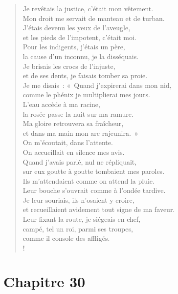 \documentclass[french,twoside]{book} %
\def\mednobreak{\ifdim\lastskip<\medskipamount
  \removelastskip\nopagebreak\medskip\fi}
\newcommand{\labelblock}[1]{\medbreak{\noindent\color{rubric}\bfseries #1}\par\mednobreak}
\newcommand\chapteropen{} %
\newcommand\chaptercont{} %
\newcommand\chapterclose{} %
\begin{document}
\begin{verse}
Je revêtais la justice, c’était mon vêtement. \\
Mon droit me servait de manteau et de turban.\\
J’étais devenu les yeux de l’aveugle, \\
et les pieds de l’impotent, c’était moi.\\
Pour les indigents, j’étais un père, \\
la cause d’un inconnu, je la disséquais.\\
Je brisais les crocs de l’injuste, \\
et de ses dents, je faisais tomber sa proie.\\
Je me disais : « Quand j’expirerai dans mon nid, \\
comme le phénix je multiplierai mes jours.\\
L’eau accède à ma racine, \\
la rosée passe la nuit sur ma ramure.\\
Ma gloire retrouvera sa fraîcheur, \\
et dans ma main mon arc rajeunira. »\\
On m’écoutait, dans l’attente. \\
On accueillait en silence mes avis.\\
Quand j’avais parlé, nul ne répliquait, \\
sur eux goutte à goutte tombaient mes paroles.\\
Ils m’attendaient comme on attend la pluie. \\
Leur bouche s’ouvrait comme à l’ondée tardive.\\
Je leur souriais, ils n’osaient y croire, \\
et recueillaient avidement tout signe de ma faveur.\\
Leur fixant la route, je siégeais en chef, \\
campé, tel un roi, parmi ses troupes, \\
comme il console des affligés.\\!
\end{verse}
\chapterclose


\chapteropen
\chapter[Chapitre 30]{Chapitre 30}\renewcommand{\leftmark}{Chapitre 30}


\chaptercont

\labelblock{La misère d’aujourd’hui}
\end{document}
